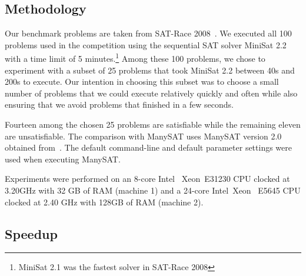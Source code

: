 \documentclass[letterpaper, compsoc, conference]{IEEEtran}
\begin{document}
\subsection{Methodology}
Our benchmark problems are taken from SAT-Race 2008~\cite{SATRace2008}. We
executed all 100 problems used in the competition using the sequential SAT
solver MiniSat 2.2 with a time limit of 5 minutes.\footnote{MiniSat 2.1 was the
fastest solver in SAT-Race 2008} Among these 100 problems, we chose to
experiment with a subset of 25 problems that took MiniSat 2.2 between 40s and
200s to execute. Our intention in choosing this subset was to choose a small
number of problems that we could execute relatively quickly and often while
also ensuring that we avoid problems that finished in a few seconds.

Fourteen among the chosen 25 problems are satisfiable while the remaining
eleven are unsatisfiable. The comparison with ManySAT uses ManySAT version 2.0
obtained from~\cite{ManySATWeb}.  The default command-line and default
parameter settings were used when executing ManySAT.


Experiments were performed on an 8-core Intel\textregistered
~Xeon\textregistered ~E31230 CPU clocked at 3.20GHz with 32 GB of RAM (machine
1) and a 24-core Intel\textregistered~Xeon ~E5645 CPU clocked at 2.40 GHz with
128GB of RAM (machine 2). 

\subsection{Speedup}
\label{sec:speedup}
\end{document}

